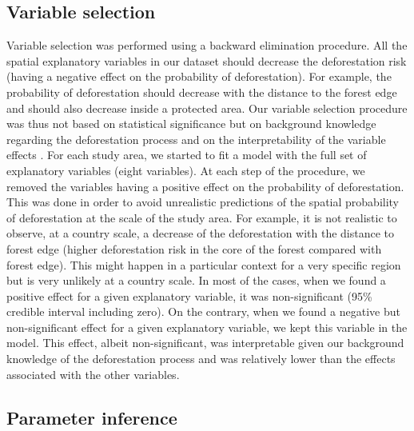 \documentclass[
  12pt,
]{article}
\begin{document}
\hypertarget{variable-selection}{%
\subsection{Variable selection}\label{variable-selection}}

Variable selection was performed using a backward elimination procedure. All the spatial explanatory variables in our dataset should decrease the deforestation risk (having a negative effect on the probability of deforestation). For example, the probability of deforestation should decrease with the distance to the forest edge and should also decrease inside a protected area. Our variable selection procedure was thus not based on statistical significance but on background knowledge regarding the deforestation process and on the interpretability of the variable effects \citep{Heinze2018}. For each study area, we started to fit a model with the full set of explanatory variables (eight variables). At each step of the procedure, we removed the variables having a positive effect on the probability of deforestation. This was done in order to avoid unrealistic predictions of the spatial probability of deforestation at the scale of the study area. For example, it is not realistic to observe, at a country scale, a decrease of the deforestation with the distance to forest edge (higher deforestation risk in the core of the forest compared with forest edge). This might happen in a particular context for a very specific region but is very unlikely at a country scale. In most of the cases, when we found a positive effect for a given explanatory variable, it was non-significant (95\% credible interval including zero). On the contrary, when we found a negative but non-significant effect for a given explanatory variable, we kept this variable in the model. This effect, albeit non-significant, was interpretable given our background knowledge of the deforestation process and was relatively lower than the effects associated with the other variables.

\hypertarget{parameter-inference}{%
\subsection{Parameter inference}\label{parameter-inference}}
\end{document}
